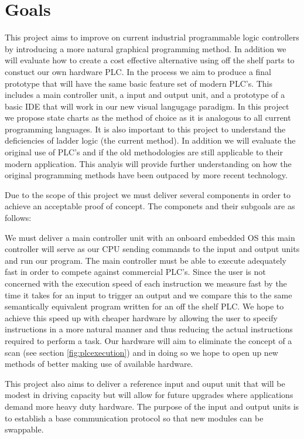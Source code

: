 \section{Goals}

This project aims to improve on current industrial programmable logic controllers by introducing a more natural graphical programming method. In addition we will evaluate how to create a cost effective alternative using off the shelf parts to constuct our own hardware PLC. In the process we aim to produce a final prototype that will have the same basic feature set of modern PLC's. This includes a main controller unit, a input and output unit, and a prototype of a basic IDE that will work in our new visual langugage paradigm. In this project we propose state charts as the method of choice as it is analogous to all current programming languages. It is also important to this project to understand the deficiencies of ladder logic (the current method). In addition we will evaluate the original use of PLC's and if the old methodologies are still applicable to their modern application. This analyis will provide further understanding on how the original programming methods have been outpaced by more recent technology.

Due to the scope of this project we must deliver several components in order to achieve an acceptable proof of concept. The componets and their subgoals are as follows:

We must deliver a main controller unit with an onboard embedded OS this main controller will serve as our CPU sending commands to the input and output units and run our program. The main controller must be able to execute adequately fast in order to compete against commercial PLC's. Since the user is not concerned with the execution speed of each instruction we measure fast by the time it takes for an input to trigger an output and we compare this to the same semantically equivalent program written for an off the shelf PLC. We hope to achieve this speed up with cheaper hardware by allowing the user to specify instructions in a more natural manner and thus reducing the actual instructions required to perform a task. Our hardware will aim to eliminate the concept of a scan (see section \ref{fig:plcexecution}) and in doing so we hope to open up new methods of better making use of available hardware.

This project also aims to deliver a reference input and ouput unit that will be modest in driving capacity but will allow for future upgrades where applications demand more heavy duty hardware. The purpose of the input and output units is to establish a base communication protocol so that new modules can be swappable.

